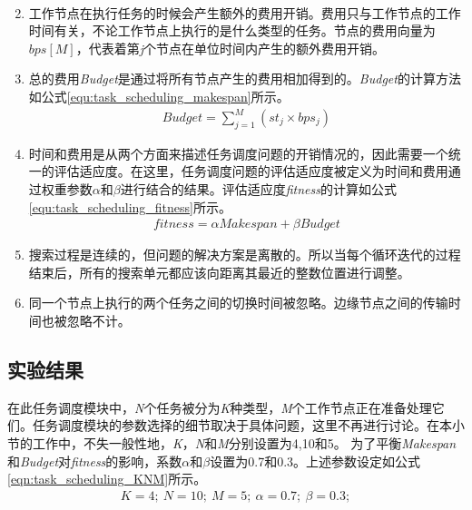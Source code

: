 \begin{enumerate}[]
\begin{eqnarray}
    \end{eqnarray}
    \item 工作节点在执行任务的时候会产生额外的费用开销。费用只与工作节点的工作时间有关，不论工作节点上执行的是什么类型的任务。节点的费用向量为$bps[M]$，代表着第\emph{j}个节点在单位时间内产生的额外费用开销。
    \item  总的费用\emph{Budget}是通过将所有节点产生的费用相加得到的。\emph{Budget}的计算方法如公式\ref{equ:task_scheduling_makespan}所示。
    \begin{eqnarray}\label{equ:task_scheduling_budget}
        Budget=\sum_{j=1}^{M} (st_j \times bps_j)
    \end{eqnarray}
    \item 时间和费用是从两个方面来描述任务调度问题的开销情况的，因此需要一个统一的评估适应度。在这里，任务调度问题的评估适应度被定义为时间和费用通过权重参数$\alpha$和$\beta$进行结合的结果。评估适应度\emph{fitness}的计算如公式\ref{equ:task_scheduling_fitness}所示。
    \begin{eqnarray}\label{equ:task_scheduling_fitness}
        fitness=\alpha Makespan + \beta Budget
    \end{eqnarray}
    \item 搜索过程是连续的，但问题的解决方案是离散的。所以当每个循环迭代的过程结束后，所有的搜索单元都应该向距离其最近的整数位置进行调整。
    \item 同一个节点上执行的两个任务之间的切换时间被忽略。边缘节点之间的传输时间也被忽略不计。
\end{enumerate}
\subsection{实验结果}
在此任务调度模块中，\emph{N}个任务被分为\emph{K}种类型，\emph{M}个工作节点正在准备处理它们。任务调度模块的参数选择的细节取决于具体问题，这里不再进行讨论。在本小节的工作中，不失一般性地，\emph{K}，\emph{N}和\emph{M}分别设置为4,10和5。 为了平衡\emph{Makespan}和\emph{Budget}对\emph{fitness}的影响，系数$\alpha$和$\beta$设置为0.7和0.3。上述参数设定如公式\ref{eqn:task_scheduling_KNM}所示。
\begin{eqnarray}\label{eqn:task_scheduling_KNM}
    K=4;\ N=10;\ M=5;\ \alpha=0.7;\ \beta=0.3; 
\end{eqnarray}

